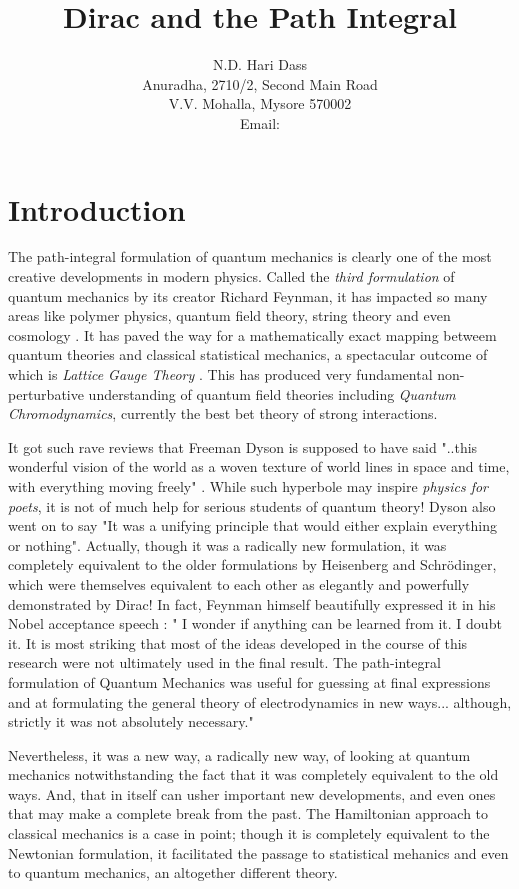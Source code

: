 \documentclass[a4paper]{JHEP3}
\title{Dirac and the Path Integral}
\author{N.D. Hari Dass \\  
Anuradha, 2710/2, Second Main Road\\V.V. Mohalla, Mysore 570002\\
Email: \email{dass@tifrh.res.in}}
\begin{document}
\section{Introduction}
The path-integral formulation of quantum mechanics is clearly one of the most creative developments in modern physics. Called the 
{\it third formulation} of quantum mechanics by its creator Richard Feynman, it has impacted so many areas like polymer physics, quantum field theory, string theory and even cosmology \cite{kleinert}. It has paved the way for a mathematically exact mapping betweem quantum theories and
classical statistical mechanics, a spectacular outcome of which is {\it Lattice Gauge Theory} \cite{seiler}. This has produced very fundamental non-perturbative understanding of quantum field theories including {\it Quantum Chromodynamics}, currently the best bet theory of strong interactions.

It got such rave reviews that Freeman Dyson is supposed to have said "..this wonderful vision of the world as a woven texture of world lines in space and time, with everything moving freely" \cite{gleick}. While such hyperbole may inspire {\it physics for poets}, it is not of much
help for serious students of quantum theory! Dyson also went on to say "It was a unifying principle that would either explain everything or nothing". Actually, though it was a radically new formulation, it was completely equivalent to the older formulations by Heisenberg and Schr\"odinger, which were themselves equivalent to each other as elegantly and powerfully demonstrated by Dirac! In fact, Feynman himself beautifully
expressed it in his Nobel acceptance speech \cite{nobel}: " I wonder if anything can be learned from it. I doubt it. It is most striking that 
most of the ideas developed in the course of this research were not ultimately used in the final result. The path-integral formulation of 
Quantum Mechanics was useful for guessing at final expressions and at formulating the general theory of electrodynamics in new ways...
although, strictly it was not absolutely necessary."

Nevertheless, it was a new way, a radically new way, of looking at quantum mechanics notwithstanding the fact that it was completely equivalent
to the old ways. And, that in itself can usher important new developments, and even ones that may make a complete break from the past. The
Hamiltonian approach to classical mechanics is a case in point; though it is completely equivalent to the Newtonian formulation, it facilitated
the passage to statistical mehanics and even to quantum mechanics, an altogether different theory.
\end{document}
